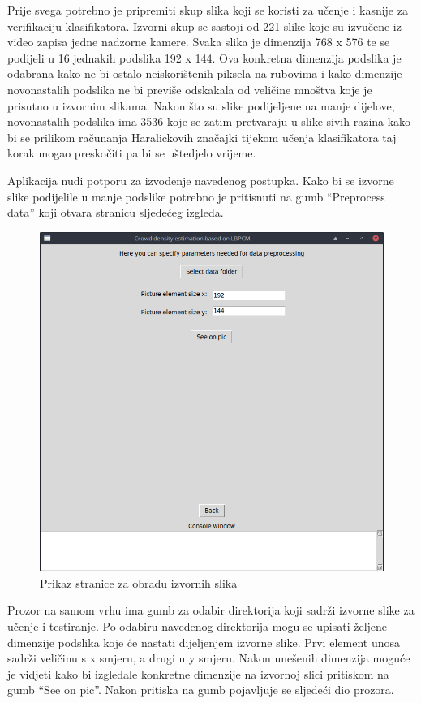 \documentclass[times, utf8, zavrsni]{fer}
\begin{document}
Prije svega potrebno je pripremiti skup slika koji se koristi za učenje i 
kasnije za verifikaciju klasifikatora. Izvorni skup se sastoji od 221 slike
koje su izvučene iz video zapisa jedne nadzorne kamere. Svaka slika je dimenzija
768 x 576 te se podijeli u 16 jednakih podslika 192 x 144. Ova konkretna dimenzija
podslika je odabrana kako ne bi ostalo neiskorištenih piksela na rubovima i 
kako dimenzije novonastalih podslika ne bi previše odskakala od veličine mnoštva
koje je prisutno u izvornim slikama. Nakon što su slike podijeljene na manje dijelove,
novonastalih podslika ima 3536 koje se zatim pretvaraju u slike sivih razina kako
bi se prilikom računanja Haralickovih značajki tijekom učenja klasifikatora taj
korak mogao preskočiti pa bi se uštedjelo vrijeme. 

\bigbreak

Aplikacija nudi potporu za izvođenje navedenog postupka. Kako bi se izvorne
slike podijelile u manje podslike potrebno je pritisnuti na gumb \enquote{Preprocess data}
koji otvara stranicu sljedećeg izgleda.

\begin{figure}[ht]
\centering
\includegraphics[scale=0.4]{img/preprocessdata.png}
\caption{Prikaz stranice za obradu izvornih slika}
\end{figure}

Prozor na samom vrhu ima gumb za odabir direktorija koji sadrži izvorne slike
za učenje i testiranje. Po odabiru navedenog direktorija mogu se upisati 
željene dimenzije podslika koje će nastati dijeljenjem izvorne slike.
Prvi element unosa sadrži veličinu s x smjeru, a drugi u y smjeru. Nakon
unešenih dimenzija moguće je vidjeti kako bi izgledale konkretne dimenzije
na izvornoj slici pritiskom na gumb \enquote{See on pic}. Nakon pritiska na gumb
pojavljuje se sljedeći dio prozora.
\end{document}
